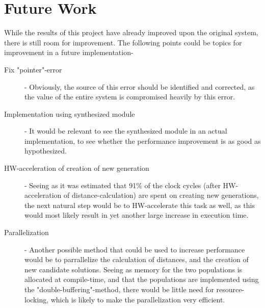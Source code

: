 
\chapter{Future Work}
While the results of this project have already improved upon the original system, there is still room for improvement. The following points could be topics for improvement in a future implementation-

\begin{description}
	\item [Fix "pointer"-error] - Obviously, the source of this error should be identified and corrected, as the value of the entire system is compromised heavily by this error.
	\item [Implementation using synthesized module] - It would be relevant to see the synthesized module in an actual implementation, to see whether the performance improvement is as good as hypothesized.
	\item [HW-acceleration of creation of new generation] - Seeing as it was estimated that 91\% of the clock cycles (after HW-acceleration of distance-calculation) are spent on creating new generations, the next natural step would be to HW-accelerate this task as well, as this would most likely result in yet another large increase in execution time.
	\item [Parallelization] - Another possible method that could be used to increase performance would be to parrallelize the calculation of distances, and the creation of new candidate solutions. Seeing as memory for the two populations is allocated at compile-time, and that the populations are implemented using the "double-buffering"-method, there would be little need for resource-locking, which is likely to make the parallelization very efficient.
\end{description}